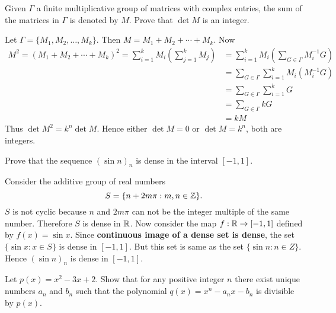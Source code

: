 \question[P\&B, 284] Given $\Gamma$ a finite multiplicative group of matrices with complex entries, the sum of the matrices in $\Gamma$ is denoted by $M$. Prove that $\det{M}$ is an integer.

\begin{solution}
    Let $\Gamma=\{M_1, M_2, \ldots, M_k\}$. Then $M=M_1+M_2+\cdots+M_k$. Now
    \begin{align*}
        M^2=(M_1+M_2+\cdots+M_k)^2=\sum_{i=1}^{k}{M_i}\left(\sum_{j=1}^{k}{M_j}\right)&=\sum_{i=1}^{k}{M_i}\left(\sum_{G\in\Gamma}{M_i^{-1}G}\right)\\
        &=\sum_{G\in\Gamma}\sum_{i=1}^{k}{M_i}{(M_i^{-1}G)}\\
        &=\sum_{G\in\Gamma}\sum_{i=1}^{k}{G}\\
        &=\sum_{G\in\Gamma}{kG}\\
        &=kM
    \end{align*}
    Thus $\det{M^2}=k^n\det{M}$. Hence either $\det{M}=0$ or $\det{M}=k^n$, both are integers.
\end{solution}

\question[P\&B, 286] Prove that the sequence $(\sin{n})_n$ is dense in the interval $[-1,1]$.

\begin{solution}
    Consider the additive group of real numbers $$S=\{n+2m\pi: m,n\in\mathbb{Z}\}.$$
    $S$ is not cyclic because $n$ and $2m\pi$ can not be the integer multiple of the same number. Therefore $S$ is dense in $\mathbb{R}$. Now consider the map $f:\mathbb{R}\to[-1,1]$ defined by $f(x)=\sin{x}$. Since \textbf{continuous image of a dense set is dense}, the set $\{\sin{x}: x\in S\}$ is dense in $[-1,1]$. But this set is same as the set $\{\sin{n}:n\in Z\}$. Hence $(\sin{n})_n$ is dense in $[-1,1]$.
\end{solution}

\question[P\&B, 304] Let $p(x)=x^2-3x+2$. Show that for any positive integer $n$ there exist unique numbers $a_n$ and $b_n$ such that the polynomial $q(x)=x^n-a_nx-b_n$ is divisible by $p(x)$.


